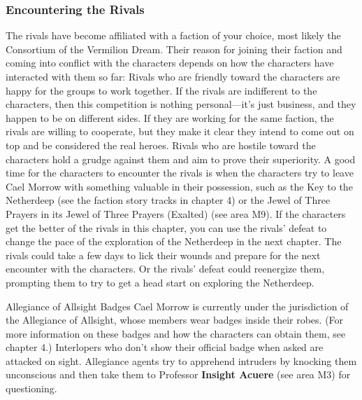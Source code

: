 \documentclass[10pt,a4,twoside,twocolumn,openany,nodeprecatedcode]{dndbook}
\begin{document}
\subsubsection{Encountering the Rivals}
The rivals have become affiliated with a faction of your choice, most likely the Consortium of the Vermilion Dream. Their reason for joining their faction and coming into conflict with the characters depends on how the characters have interacted with them so far:
{{Rivals who are friendly toward the characters are happy for the groups to work together.}}
{{If the rivals are indifferent to the characters, then this competition is nothing personal—it's just business, and they happen to be on different sides. If they are working for the same faction, the rivals are willing to cooperate, but they make it clear they intend to come out on top and be considered the real heroes.}}
{{Rivals who are hostile toward the characters hold a grudge against them and aim to prove their superiority.}}
A good time for the characters to encounter the rivals is when the characters try to leave Cael Morrow with something valuable in their possession, such as the Key to the Netherdeep (see the faction story tracks in chapter 4) or the Jewel of Three Prayers in its Jewel of Three Prayers (Exalted) (see area M9).
If the characters get the better of the rivals in this chapter, you can use the rivals' defeat to change the pace of the exploration of the Netherdeep in the next chapter. The rivals could take a few days to lick their wounds and prepare for the next encounter with the characters. Or the rivals' defeat could reenergize them, prompting them to try to get a head start on exploring the Netherdeep.
\begin{DndComment}{Allegiance of Allsight Badges}
Cael Morrow is currently under the jurisdiction of the Allegiance of Allsight, whose members wear badges inside their robes. (For more information on these badges and how the characters can obtain them, see chapter 4.) Interlopers who don't show their official badge when asked are attacked on sight. Allegiance agents try to apprehend intruders by knocking them unconscious and then take them to Professor \textbf{Insight Acuere} (see area M3) for questioning.
\end{DndComment}
\end{document}
